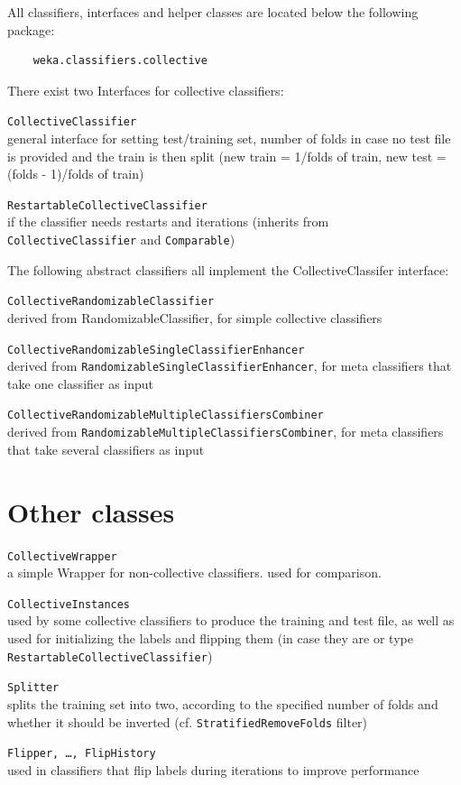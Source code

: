 \documentclass[a4paper]{book}
\begin{document}
\noindent All classifiers, interfaces and helper classes are located below the 
following package:
\begin{verbatim}
	weka.classifiers.collective
\end{verbatim}
There exist two Interfaces for collective classifiers:
\begin{tight_itemize}
	\item \texttt{CollectiveClassifier} \\
	general interface for setting test/training set, number of folds in case 
	no test file is provided and the train is then split (new train = 1/folds of train, 
	new test = (folds - 1)/folds of train)
	\item \texttt{RestartableCollectiveClassifier} \\
	if the classifier needs restarts and iterations (inherits from 
	\texttt{CollectiveClassifier} and \texttt{Comparable})
\end{tight_itemize}
The following abstract classifiers all implement the CollectiveClassifer interface:
\begin{tight_itemize}
	\item \texttt{CollectiveRandomizableClassifier} \\
	derived from RandomizableClassifier, for simple collective classifiers
	\item \texttt{CollectiveRandomizableSingleClassifierEnhancer} \\
	derived from \texttt{RandomizableSingleClassifierEnhancer}, for meta classifiers 
	that take one classifier as input
	\item \texttt{CollectiveRandomizableMultipleClassifiersCombiner} \\
	derived from \texttt{RandomizableMultipleClassifiersCombiner}, for meta 
	classifiers that take several classifiers as input
\end{tight_itemize}

\section{Other classes}
\begin{tight_itemize}
	\item \texttt{CollectiveWrapper} \\
	a simple Wrapper for non-collective classifiers. used for comparison.
	\item \texttt{CollectiveInstances} \\
	used by some collective classifiers to produce the training and test file, 
	as well as used for initializing the labels and flipping them (in case 
	they are or type \texttt{RestartableCollectiveClassifier})
	\item \texttt{Splitter} \\
	splits the training set into two, according to the specified number of 
	folds and whether it should be inverted (cf. \texttt{StratifiedRemoveFolds} filter)
	\item \texttt{Flipper, \ldots, FlipHistory} \\
	used in classifiers that flip labels during iterations to improve performance
\end{tight_itemize}
\end{document}
